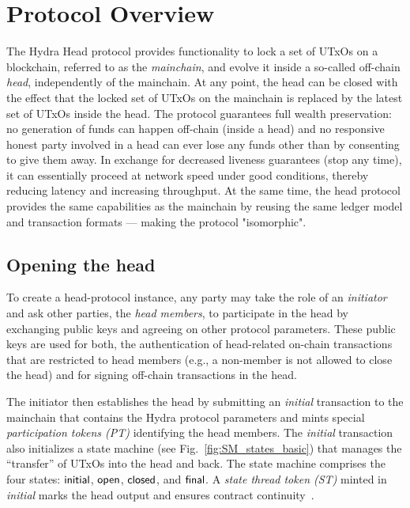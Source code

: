 \section{Protocol Overview}\label{sec:overview}


The Hydra Head protocol provides functionality to lock a set of UTxOs on a
blockchain, referred to as the \emph{mainchain}, and evolve it inside a
so-called off-chain \emph{head}, independently of the mainchain. At any point,
the head can be closed with the effect that the locked set of UTxOs on the
mainchain is replaced by the latest set of UTxOs inside the head. The protocol
guarantees full wealth preservation: no generation of funds can happen off-chain
(inside a head) and no responsive honest party involved in a head can ever lose
any funds other than by consenting to give them away. In exchange for decreased
liveness guarantees (stop any time), it can essentially proceed at network speed
under good conditions, thereby reducing latency and increasing throughput. At the
same time, the head protocol provides the same capabilities as the mainchain by
reusing the same ledger model and transaction formats --- making the protocol
"isomorphic".

\subsection{Opening the head}

To create a head-protocol instance, any party may take the role of an
\emph{initiator} and ask other parties, the \emph{head members}, to participate
in the head by exchanging public keys and agreeing on other protocol parameters.
These public keys are used for both, the authentication of head-related on-chain
transactions that are restricted to head members (e.g., a non-member is not
allowed to close the head) and for signing off-chain transactions in the head.

The initiator then establishes the head by submitting an \emph{initial}
transaction to the mainchain that contains the Hydra protocol parameters and mints special
\emph{participation tokens (PT)} identifying the head members. The
\emph{initial} transaction also initializes a state machine (see
Fig.~\ref{fig:SM_states_basic}) that manages the ``transfer'' of UTxOs into the
head and back. The state machine comprises the four states: $\mathsf{initial}$,
$\mathsf{open}$, $\mathsf{closed}$, and $\mathsf{final}$. A \emph{state thread token (ST)} minted
in \emph{initial} marks the head output and ensures contract continuity~\cite{eutxo}.

